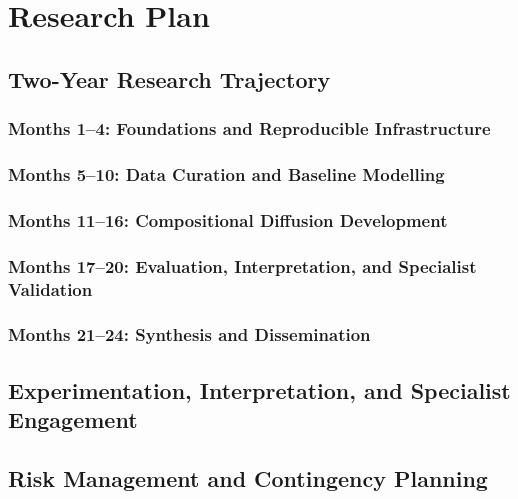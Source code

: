 \chapter{Research Plan}
\section{Two-Year Research Trajectory}
\subsection{Months 1--4: Foundations and Reproducible Infrastructure}
\subsection{Months 5--10: Data Curation and Baseline Modelling}
\subsection{Months 11--16: Compositional Diffusion Development}
\subsection{Months 17--20: Evaluation, Interpretation, and Specialist Validation}
\subsection{Months 21--24: Synthesis and Dissemination}

\section{Experimentation, Interpretation, and Specialist Engagement}

\section{Risk Management and Contingency Planning}

